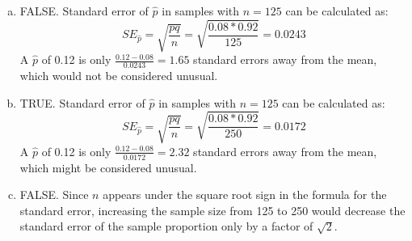{{\begin{enumerate}[(a)]
\item FALSE. Standard error of $\hat{p}$ in samples with $n = 125$ can be calculated as:
\[SE_{\hat{p}} = \sqrt{ \frac{pq}{n} } = \sqrt{\frac{0.08 * 0.92}{125}} = 0.0243 \]
A $\hat{p}$ of 0.12 is only $\frac{0.12 - 0.08}{0.0243} = 1.65$ standard errors away from the mean, which would not be considered unusual.
\item TRUE. Standard error of $\hat{p}$ in samples with $n = 125$ can be calculated as:
\[SE_{\hat{p}} = \sqrt{ \frac{pq}{n} } = \sqrt{\frac{0.08 * 0.92}{250}} = 0.0172 \]
A $\hat{p}$ of 0.12 is only $\frac{0.12 - 0.08}{0.0172} = 2.32$ standard errors away from the mean, which might be considered unusual.
\item FALSE. Since $n$ appears under the square root sign in the formula for the standard error, increasing the sample size from 125 to 250 would decrease the standard error of the sample proportion only by a factor of $\sqrt{2}$.
\end{enumerate}
}
}

%

